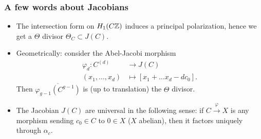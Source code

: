 \begin{frame}
\frametitle{A few words about Jacobians}

\begin{itemize}
	\item The intersection form on $H_1(C\mathbb{Z})$ induces a principal polarization, hence we get a \alert{$\Theta$ divisor} $\Theta_C \subset J(C)$.
	\item Geometrically: consider the Abel-Jacobi morphism
	\begin{align*}
	\varphi_d: C^{(d)} &\to J(C) \\
	(x_1,\ldots,x_d) &\mapsto [x_1+\ldots x_d-dc_0].
	\end{align*}
	Then $\overline{\varphi_{g-1}(C^{g-1})}$ is (up to translation) the $\Theta$ divisor. \pause
	\item The Jacobian $J(C)$ are universal in the following sense: if $C \xrightarrow{\varphi} X$ is any morphism sending $c_0 \in C$ to $0 \in X$ ($X$ abelian), then it factors uniquely through $\alpha_c$.
\end{itemize}
\end{frame}